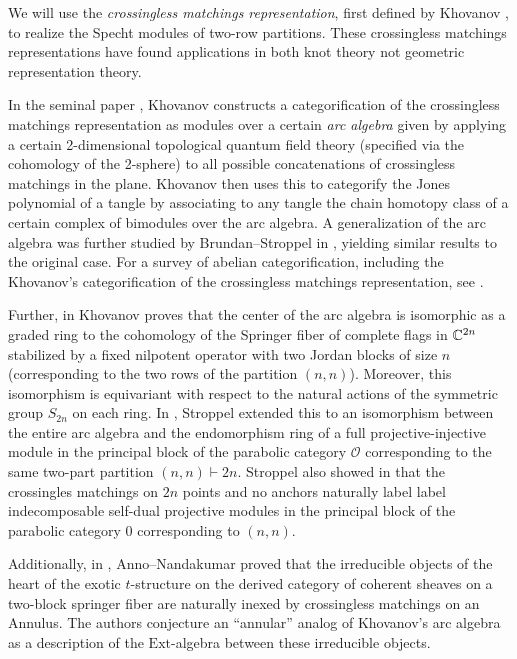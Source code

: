 \documentclass{amsart}
\begin{document}
  We will use the \emph{crossingless matchings representation}, first defined by Khovanov \cite{Khovanov, Khovanov-tangle, Khovanov-abelian}, to realize the Specht modules of two-row partitions.
  These crossingless matchings representations have found applications in both knot theory not geometric representation theory.  

  In the seminal paper \cite{Khovanov-tangle}, Khovanov constructs a categorification of the crossingless matchings representation as modules over a certain \emph{arc algebra} given by applying a certain 2-dimensional topological quantum field theory (specified via the cohomology of the 2-sphere) to all possible concatenations of crossingless matchings in the plane.
  Khovanov then uses this to categorify the Jones polynomial of a tangle by associating to any tangle the chain homotopy class of a certain complex of bimodules over the arc algebra.
  A generalization of the arc algebra was further studied by Brundan--Stroppel in \cite{Brundan-1,Brundan-2,Brundan-3,Brundan-4}, yielding similar results to the original case.
  For a survey of abelian categorification, including the Khovanov's categorification of the crossingless matchings representation, see \cite{Khovanov-abelian}.
  
  Further, in \cite{Khovanov} Khovanov proves that the center of the arc algebra is isomorphic as a graded ring to the cohomology of the Springer fiber of complete flags in $\mathbb{C}^{2n}$ stabilized by a fixed nilpotent operator with two Jordan blocks of size $n$ (corresponding to the two rows of the partition $(n,n)$).
  Moreover, this isomorphism is equivariant with respect to the natural actions of the symmetric group $S_{2n}$ on each ring.
  In \cite{Stroppel}, Stroppel extended this to an isomorphism between the entire arc algebra and the endomorphism ring of a full projective-injective module in the principal block of the parabolic category $\mathcal{O}$ corresponding to the same two-part partition $(n,n) \vdash 2n$.
  Stroppel also showed in \cite{Stroppel} that the crossingles matchings on $2n$ points and no anchors naturally label label indecomposable self-dual projective modules in the principal block of the parabolic category $\mathcal{0}$ corresponding to $(n,n)$.

  Additionally, in \cite{Anno-t,Anno-tangles}, Anno--Nandakumar proved that the irreducible objects of the heart of the exotic $t$-structure on the derived category of coherent sheaves on a two-block springer fiber are naturally inexed by crossingless matchings on an Annulus.
  The authors conjecture an ``annular'' analog of Khovanov's arc algebra as a description of the $\mathrm{Ext}$-algebra between these irreducible objects.  
\end{document}
